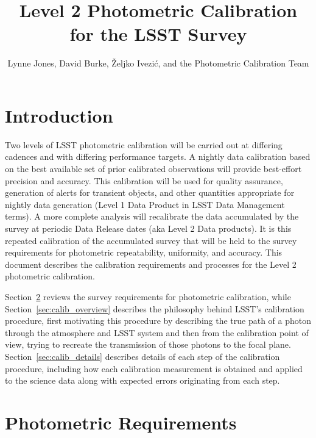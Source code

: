 \documentclass[12pt,preprint]{aastex}
\begin{document}
\title{Level 2 Photometric Calibration for the LSST Survey}

\author{
Lynne Jones, David Burke, \v{Z}eljko Ivezi\'{c}, and the Photometric Calibration Team
}



\section{Introduction}


Two levels of LSST photometric calibration will be carried out at
differing cadences and with differing performance targets. A nightly
data calibration based on the best available set of prior calibrated
observations will provide best-effort precision and accuracy. This
calibration will be used for quality assurance, generation of alerts
for transient objects, and other quantities appropriate for nightly
data generation (Level 1 Data Product in LSST Data Management terms).
A more complete analysis will recalibrate the data accumulated by the
survey at periodic Data Release dates (aka Level 2 Data products).  It
is this repeated calibration of the accumulated survey that will be
held to the survey requirements for photometric repeatability,
uniformity, and accuracy.  This document describes the calibration
requirements and processes for the Level 2 photometric calibration.

Section~\ref{sec:photoreq} reviews the survey requirements for
photometric calibration, while Section~\ref{sec:calib_overview}
describes the philosophy behind LSST's calibration procedure, first
motivating this procedure by describing the true path of a photon
through the atmosphere and LSST system and then from the calibration
point of view, trying to recreate the transmission of those photons to
the focal plane.  Section~\ref{sec:calib_details} describes details of
each step of the calibration procedure, including how each calibration
measurement is obtained and applied to the science data along with
expected errors originating from each step.

\section{Photometric Requirements}
\label{sec:photoreq}
\end{document}
